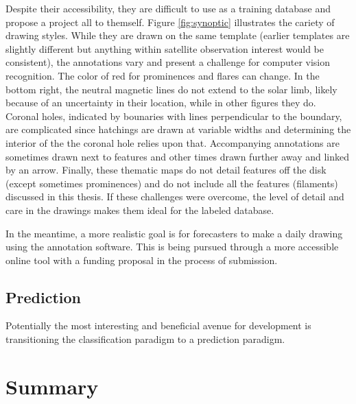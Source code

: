 \documentclass[twoside]{report}
\begin{document}
Despite their accessibility, they are difficult to use as a training database and propose a project all to themself. Figure \ref{fig:synoptic} illustrates the cariety of drawing styles. While they are drawn on the same template (earlier templates are slightly different but anything within satellite observation interest would be consistent), the annotations vary and present a challenge for computer vision recognition. The color of red for prominences and flares can change. In the bottom right, the neutral magnetic lines do not extend to the solar limb, likely because of an uncertainty in their location, while in other figures they do. Coronal holes, indicated by bounaries with lines perpendicular to the boundary, are complicated since hatchings are drawn at variable widths and determining the interior of the the coronal hole relies upon that. Accompanying annotations are sometimes drawn next to features and other times drawn further away and linked by an arrow. Finally, these thematic maps do not detail features off the disk (except sometimes prominences) and do not include all the features (filaments) discussed in this thesis. If these challenges were overcome, the level of detail and care in the drawings makes them ideal for the labeled database. 

In the meantime, a more realistic goal is for forecasters to make a daily drawing using the annotation software. This is being pursued through a more accessible online tool with a funding proposal in the process of submission. 

\subsection{Prediction}
Potentially the most interesting and beneficial avenue for development is transitioning the classification paradigm to a prediction paradigm. 
\section{Summary}




\end{document}
